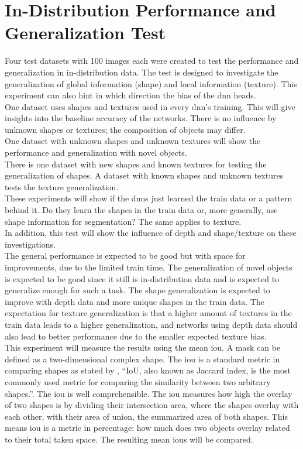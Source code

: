 	\section{In-Distribution Performance and Generalization Test}
	\label{sec:in-distribution-performance-generalization}
		Four test datasets with 100 images each were created to test the performance and generalization in in-distribution data. The test is designed to investigate the generalization of global information (shape) and local information (texture). This experiment can also hint in which direction the bias of the \ac{dnn} heads.\\
		One dataset uses shapes and textures used in every \ac{dnn}'s training. This will give insights into the baseline accuracy of the networks. There is no influence by unknown shapes or textures; the composition of objects may differ.\\
		One dataset with unknown shapes and unknown textures will show the performance and generalization with novel objects.\\
		There is one dataset with new shapes and known textures for testing the generalization of shapes. A dataset with known shapes and unknown textures tests the texture generalization.\\
		These experiments will show if the \ac{dnn}s just learned the train data or a pattern behind it. Do they learn the shapes in the train data or, more generally, use shape information for segmentation? The same applies to texture.\\
		In addition, this test will show the influence of depth and shape/texture on these investigations.\\
		The general performance is expected to be good but with space for improvements, due to the limited train time. The generalization of novel objects is expected to be good since it still is in-distribution data and is expected to generalize enough for such a task. The shape generalization is expected to improve with depth data and more unique shapes in the train data. The expectation for texture generalization is that a higher amount of textures in the train data leads to a higher generalization, and networks using depth data should also lead to better performance due to the smaller expected texture bias.\\
		This experiment will measure the results using the mean \acl{iou}. A mask can be defined as a two-dimensional complex shape. The \ac{iou} is a standard metric in comparing shapes as stated by \textcite{Rezatofighi2019}, \enquote{IoU, also known as Jaccard index, is the most commonly used metric for comparing the similarity between two arbitrary shapes.}. The \ac{iou} is well comprehensible. The \ac{iou} measures how high the overlay of two shapes is by dividing their intersection area, where the shapes overlay with each other, with their area of union, the summarized area of both shapes. This means \ac{iou} is a metric in percentage: how much does two objects overlay related to their total taken space. The resulting mean \ac{iou}s will be compared.\\
